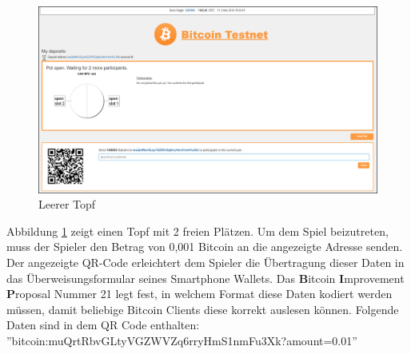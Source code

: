\begin{figure}[H]
\centering
\includegraphics[width=1\linewidth]{Figures/btc_gui/pot_open_empty}
\decoRule
\caption{Leerer Topf}
\label{fig:pot_open_empty}
\end{figure}
Abbildung \ref{fig:pot_open_empty} zeigt einen Topf mit 2 freien Plätzen. Um dem Spiel beizutreten, muss der Spieler den Betrag von 0,001 Bitcoin an die angezeigte Adresse senden. Der angezeigte QR-Code erleichtert dem Spieler die Übertragung dieser Daten in das Überweisungsformular seines Smartphone Wallets. Das \textbf{B}itcoin \textbf{I}mprovement \textbf{P}roposal Nummer 21\citep{bip21} legt fest, in welchem Format diese Daten kodiert werden müssen, damit beliebige Bitcoin Clients diese korrekt auslesen können. 
Folgende Daten sind in dem QR Code enthalten:\\ ''bitcoin:muQrtRbvGLtyVGZWVZq6rryHmS1nmFu3Xk?amount=0.01''

